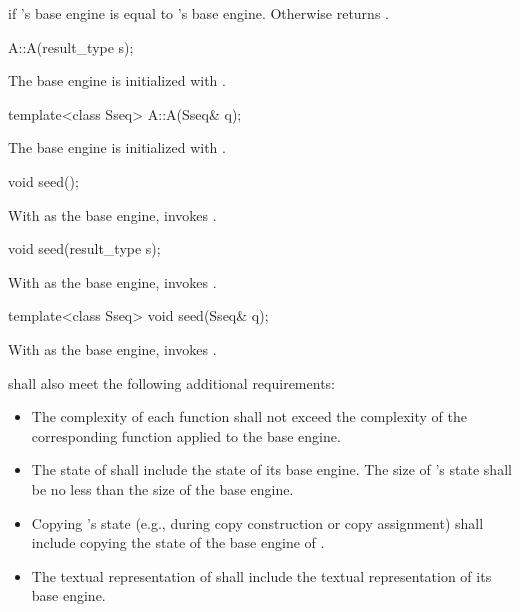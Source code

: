 \begin{itemdescr}
\pnum\returns
  if 's base engine is equal to 's base engine.
 Otherwise returns .
\end{itemdescr}


\begin{itemdecl}
A::A(result_type s);
\end{itemdecl}

\begin{itemdescr}
\pnum\effects
 The base engine is initialized
 with .
\end{itemdescr}


\begin{itemdecl}
template<class Sseq> A::A(Sseq& q);
\end{itemdecl}

\begin{itemdescr}
\pnum\effects
 The base engine is initialized
 with .
\end{itemdescr}

\begin{itemdecl}
void seed();
\end{itemdecl}

\begin{itemdescr}
\pnum\effects
 With  as the base engine, invokes .
\end{itemdescr}

\begin{itemdecl}
void seed(result_type s);
\end{itemdecl}

\begin{itemdescr}
\pnum\effects
 With  as the base engine, invokes .
\end{itemdescr}

\begin{itemdecl}
template<class Sseq> void seed(Sseq& q);
\end{itemdecl}

\begin{itemdescr}
\pnum\effects
 With  as the base engine, invokes .
\end{itemdescr}

\pnum
{} shall also meet
the following additional requirements:
\begin{itemize}
 \item
   The complexity
   of each function
   shall not exceed the complexity
   of the corresponding function
   applied to the base engine.
 \item
   The state
   of 
   shall include the state
   of its base engine.
   The size of 's state
   shall be no less than the size of the base engine.
 \item
   Copying 's state
   (e.g., during copy construction or copy assignment)
   shall include copying
   the state of the base engine of .
 \item
   The textual representation
   of 
   shall include
   the textual representation of its base engine.
\end{itemize}

